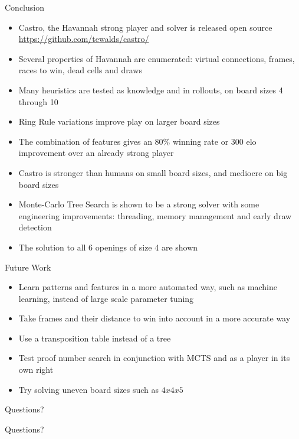 \documentclass{beamer} %
\begin{document}
\begin{frame}{Conclusion}
\begin{itemize}
	\item Castro, the Havannah strong player and solver is released open source \url{https://github.com/tewalds/castro/}
	\item Several properties of Havannah are enumerated: virtual connections, frames, races to win, dead cells and draws
	\item Many heuristics are tested as knowledge and in rollouts, on board sizes 4 through 10
	\item Ring Rule variations improve play on larger board sizes
	\item The combination of features gives an 80\% winning rate or 300 elo improvement over an already strong player
	\item Castro is stronger than humans on small board sizes, and mediocre on big board sizes
	\item Monte-Carlo Tree Search is shown to be a strong solver with some engineering improvements: threading, memory management and early draw detection
	\item The solution to all 6 openings of size 4 are shown
\end{itemize}
\end{frame}


\begin{frame}{Future Work}
\begin{itemize}
\item Learn patterns and features in a more automated way, such as machine learning, instead of large scale parameter tuning
\item Take frames and their distance to win into account in a more accurate way
\item Use a transposition table instead of a tree
\item Test proof number search in conjunction with MCTS and as a player in its own right
\item Try solving uneven board sizes such as $4x4x5$
\end{itemize}
\end{frame}


\begin{frame}{Questions?}
\begin{center}
\Huge
Questions?
\end{center}
\end{frame}
\end{document}
